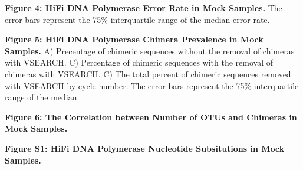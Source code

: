 \documentclass[12pt,]{article}
\begin{document}
\textbf{Figure 4: HiFi DNA Polymerase Error Rate in Mock Samples.} The
error bars represent the 75\% interquartile range of the median error
rate.

\textbf{Figure 5: HiFi DNA Polymerase Chimera Prevalence in Mock
Samples.} A) Precentage of chimeric sequences without the removal of
chimeras with VSEARCH. C) Percentage of chimeric sequences with the
removal of chimeras with VSEARCH. C) The total percent of chimeric
sequences removed with VSEARCH by cycle number. The error bars represent
the 75\% interquartile range of the median.

\textbf{Figure 6: The Correlation between Number of OTUs and Chimeras in
Mock Samples.}

\newpage

\textbf{Figure S1: HiFi DNA Polymerase Nucleotide Subsitutions in Mock
Samples.}
\end{document}
